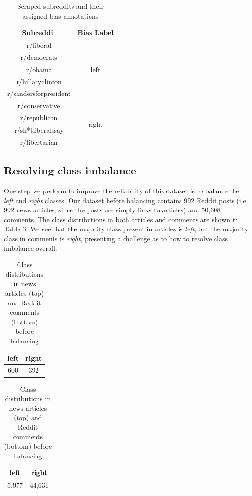 \begin{table}[ht]
    \centering
    \begin{tabular}{|c|c|}
        \hline
        \textbf{Subreddit} & \textbf{Bias Label} \\
        \hline
        r/liberal & \multirow{5}{2em}{left} \\
        r/democrats & \\
        r/obama & \\
        r/hillaryclinton & \\
        r/sandersforpresident & \\
        \hline
        r/conservative & \multirow{4}{2em}{right} \\
        r/republican & \\
        r/sh*tliberalssay & \\
        r/libertarian & \\
        \hline
    \end{tabular}
    \caption{Scraped subreddits and their assigned bias annotations}
    \label{tab:subreddit-list}
\end{table}

\subsection{Resolving class imbalance}

One step we perform to improve the reliability of this dataset is to balance the \textit{left} and \textit{right} classes. Our dataset before balancing contains 992 Reddit posts (i.e. 992 news articles, since the posts are simply links to articles) and 50,608 comments. The class distributions in both articles and comments are shown in Table \ref{tab:reddit-classes-before-balancing}. We see that the majority class present in articles is \textit{left}, but the majority class in comments is \textit{right}, presenting a challenge as to how to resolve class imbalance overall.

\begin{table}[ht]
    \begin{center}
        \begin{tabular}{|c|c|}
            \hline
            left & right \\
            \hline
            600 & 392 \\
            \hline
        \end{tabular}
    \end{center} \vspace{5pt}
    \begin{center}
        \begin{tabular}{|c|c|}
            \hline
            left & right \\
            \hline
            5,977 & 44,631 \\
            \hline
        \end{tabular}
    \end{center}
    \caption{Class distributions in news articles (top) and Reddit comments (bottom) before balancing}
    \label{tab:reddit-classes-before-balancing}
\end{table}

